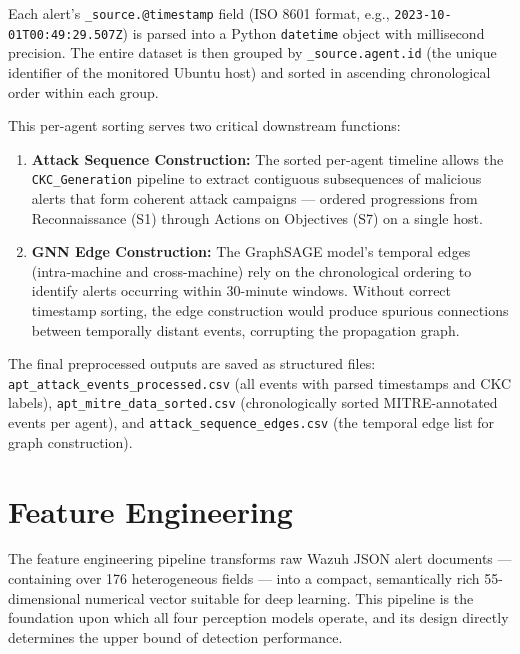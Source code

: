 Each alert's \texttt{\_source.@timestamp} field (ISO 8601 format, e.g., \texttt{2023-10-01T00:49:29.507Z}) is parsed into a Python \texttt{datetime} object with millisecond precision. The entire dataset is then grouped by \texttt{\_source.agent.id} (the unique identifier of the monitored Ubuntu host) and sorted in ascending chronological order within each group.

This per-agent sorting serves two critical downstream functions:

\begin{enumerate}
    \item \textbf{Attack Sequence Construction:} The sorted per-agent timeline allows the \texttt{CKC\_Generation} pipeline to extract contiguous subsequences of malicious alerts that form coherent attack campaigns --- ordered progressions from Reconnaissance (S1) through Actions on Objectives (S7) on a single host.
    \item \textbf{GNN Edge Construction:} The GraphSAGE model's temporal edges (intra-machine and cross-machine) rely on the chronological ordering to identify alerts occurring within 30-minute windows. Without correct timestamp sorting, the edge construction would produce spurious connections between temporally distant events, corrupting the propagation graph.
\end{enumerate}

The final preprocessed outputs are saved as structured files: \texttt{apt\_attack\_events\_processed.csv} (all events with parsed timestamps and CKC labels), \texttt{apt\_mitre\_data\_sorted.csv} (chronologically sorted MITRE-annotated events per agent), and \texttt{attack\_sequence\_edges.csv} (the temporal edge list for graph construction).



\section{Feature Engineering}
\label{sec:feature_engineering}

The feature engineering pipeline transforms raw Wazuh JSON alert documents --- containing over 176 heterogeneous fields --- into a compact, semantically rich 55-dimensional numerical vector suitable for deep learning. This pipeline is the foundation upon which all four perception models operate, and its design directly determines the upper bound of detection performance.

